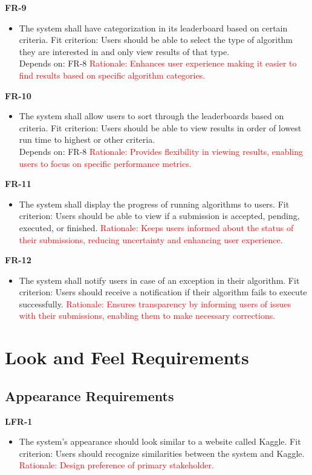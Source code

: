 \documentclass[12pt]{article}
\begin{document}
\textbf{FR-9}
\begin{itemize}
    \item The system shall have categorization in its leaderboard based on certain criteria. \hfill \break
    Fit criterion: Users should be able to select the type of algorithm they are interested in and only view results of that type. \\
    Depends on: FR-8
    \hfill \break
    \textcolor{red} {Rationale: Enhances user experience making it easier to find results based on specific algorithm categories.}
\end{itemize}
\textbf{FR-10}
\begin{itemize}
    \item The system shall allow users to sort through the leaderboards based on criteria. \hfill \break
    Fit criterion: Users should be able to view results in order of lowest run time to highest or other criteria. \\
    Depends on: FR-8
    \hfill \break
    \textcolor{red} {Rationale: Provides flexibility in viewing results, enabling users to focus on specific performance metrics.}
\end{itemize}
\textbf{FR-11}
\begin{itemize}
    \item The system shall display the progress of running algorithms to users. \hfill \break
    Fit criterion: Users should be able to view if a submission is accepted, pending, executed, or finished.
    \hfill \break
    \textcolor{red} {Rationale: Keeps users informed about the status of their submissions, reducing uncertainty and enhancing user experience.}
\end{itemize}
\textbf{FR-12}
\begin{itemize}
    \item The system shall notify users in case of an exception in their algorithm. \hfill \break
    Fit criterion: Users should receive a notification if their algorithm fails to execute successfully.
    \hfill \break
    \textcolor{red} {Rationale: Ensures transparency by informing users of issues with their submissions, enabling them to make necessary corrections.}
\end{itemize}

\section{Look and Feel Requirements}
\subsection{Appearance Requirements}
\textbf{LFR-1}
\begin{itemize}
    \item The system’s appearance should look similar to a website called Kaggle. \hfill \break
    Fit criterion: Users should recognize similarities between the system and Kaggle. \\
    \textcolor{red} {Rationale: Design preference of primary stakeholder.}
\end{itemize}
\end{document}
